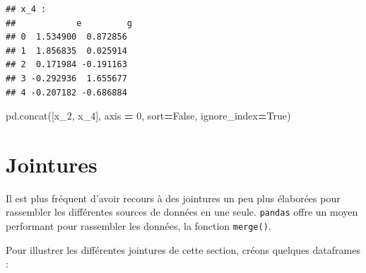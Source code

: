 \documentclass[12pt,]{book}
\newenvironment{Shaded}{\begin{snugshade}}{\end{snugshade}}
\newcommand{\DecValTok}[1]{\textcolor[rgb]{0.00,0.00,0.81}{#1}}
\newcommand{\VariableTok}[1]{\textcolor[rgb]{0.00,0.00,0.00}{#1}}
\newcommand{\OperatorTok}[1]{\textcolor[rgb]{0.81,0.36,0.00}{\textbf{#1}}}
\newcommand{\NormalTok}[1]{#1}
\numberwithin{equation}{section}
\numberwithin{countremarque}{section}
\begin{document}
\begin{lstlisting}
## x_4 : 
##            e         g
## 0  1.534900  0.872856
## 1  1.856835  0.025914
## 2  0.171984 -0.191163
## 3 -0.292936  1.655677
## 4 -0.207182 -0.686884
\end{lstlisting}

\begin{Shaded}
\begin{Highlighting}[]
\NormalTok{pd.concat([x_2, x_4], axis }\OperatorTok{=} \DecValTok{0}\NormalTok{, sort}\OperatorTok{=}\VariableTok{False}\NormalTok{, ignore_index}\OperatorTok{=}\VariableTok{True}\NormalTok{)}
\end{Highlighting}
\end{Shaded}

\section{Jointures}\label{pandas-jointures}

Il est plus fréquent d'avoir recours à des jointures un peu plus
élaborées pour rassembler les différentes sources de données en une
seule. \texttt{pandas} offre un moyen performant pour rassembler les
données, la fonction \texttt{merge()}.

Pour illustrer les différentes jointures de cette section, créons
quelques dataframes :
\end{document}
